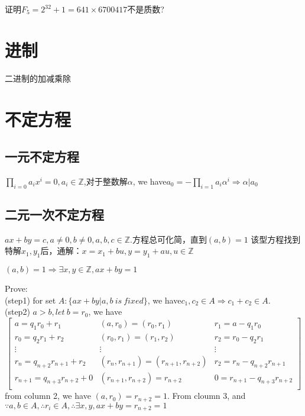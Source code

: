 \documentclass[UTF8]{../09-Mathematics}
\begin{document}
\begin{proposition}
    证明$F_5 = 2^32+1 = 641 \times 6700417$不是质数?
\end{proposition}




\section{进制}

二进制的加减乘除


\section{不定方程}

\subsection{一元不定方程}
$\prod_{i=0} a_ix^i = 0, a_i  \in \mathbb Z$,对于整数解$\alpha$, we have$a_0 = -\prod_{i=1} a_i\alpha^i \Rightarrow \alpha | a_0 $


\subsection{二元一次不定方程}

$ax + by = c, a \neq 0, b \neq 0, a, b, c \in \mathbb Z$.方程总可化简，直到$(a,b) = 1$
该型方程找到特解$x_1, y_1$后，通解：$x = x_1 + bu, y = y_1 + au, u \in \mathbb Z$


\begin{proposition}
    $ (a,b) = 1 \Rightarrow \exists x,y \in \mathbb Z, ax+by = 1$

    Prove:\\
    (step1) for set $A:\{  ax+by | a,b \ is \ fixed\}$, we have$c_1, c_2 \in A \Rightarrow c_1 + c_2 \in A$.\\
    (step2) $a>b, let \ b = r_0$, we have
    \begin{equation}
        \begin{bmatrix}
           a= q_{1}r_{0} + r_{1} & (a,r_0) = (r_0, r_1) & r_1 = a -  q_{1}r_{0}\\
           r_0= q_{2}r_{1} + r_{2} & (r_0,r_1) = (r_1, r_2) & r_2 = r_0 -  q_{2}r_{1}\\
           \vdots & \vdots & \vdots\\
           r_n= q_{n+2}r_{n+1} + r_{2} & (r_{n},r_{n+1}) = (r_{n+1}, r_{n+2}) & r_2 = r_n - q_{n+2}r_{n+1}\\
           r_{n+1}= q_{n+3}r_{n+2} + 0 & (r_{n+1},r_{n+2}) = r_{n+2} & 0= r_{n+1} - q_{n+3}r_{n+2}\\
        \end{bmatrix}
    \end{equation} 
    from column 2, we have $(a,r_0) = r_{n+2} = 1$. From cloumn 3, and $\because a, b \in A, \therefore r_i \in A, \therefore \exists x, y, ax+by = r_{n+2} = 1$

\end{proposition}
\end{document}
